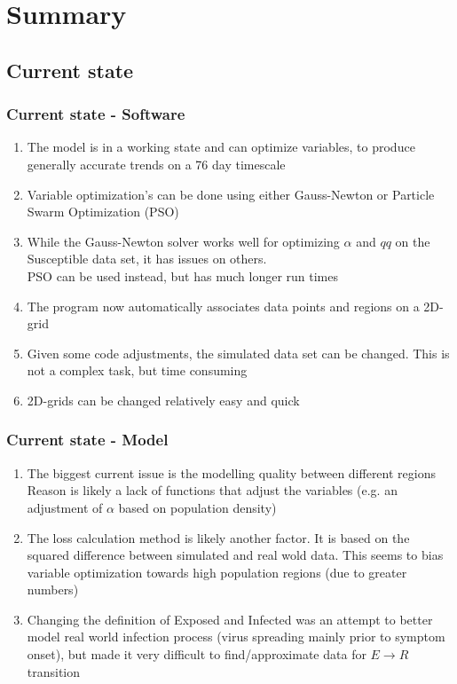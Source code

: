 \documentclass{beamer}
\begin{document}
\section{Summary}
\subsection{Current state}
\begin{frame}
	\frametitle{Current state - Software}
	\begin{enumerate}[$\bullet$]
		\item The model is in a working state and can optimize variables, to produce generally accurate trends on a 76 day timescale
		\item Variable optimization's can be done using either Gauss-Newton or Particle Swarm Optimization (PSO)
		\item While the Gauss-Newton solver works well for optimizing $\alpha$ and $qq$ on the Susceptible data set, it has issues on others.\\
			PSO can be used instead, but has much longer run times
		\item The program now automatically associates data points and regions on a 2D-grid
		\item Given some code adjustments, the simulated data set can be changed. This is not a complex task, but time consuming
		\item 2D-grids can be changed relatively easy and quick
	\end{enumerate}
\end{frame}

\begin{frame}
	\frametitle{Current state - Model}
	\label{sec:StateModel}
	\begin{enumerate}[$\bullet$]
		\item The biggest current issue is the modelling quality between different regions\\
			Reason is likely a lack of functions that adjust the variables (e.g. an adjustment of $\alpha$ based on population density)
		\item The loss calculation method is likely another factor. It is based on the squared difference between simulated
			and real wold data. This seems to bias variable optimization towards high population regions (due to greater numbers)
		\item Changing the definition of Exposed and Infected was an attempt to better model real world infection process (virus spreading mainly
			prior to symptom onset), but made it very difficult to find/approximate data for $E\rightarrow R$ transition
	\end{enumerate}
\end{frame}
\end{document}
